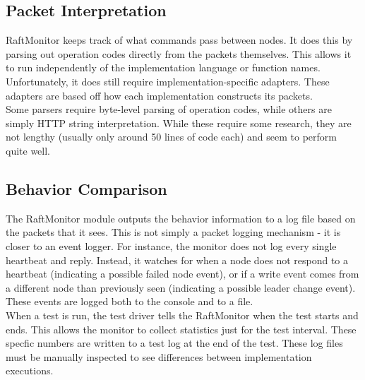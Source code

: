\documentclass[UTF8]{article}
\begin{document}
\subsection{Packet Interpretation}
RaftMonitor keeps track of what commands pass between nodes. It does this by parsing out operation codes directly from the packets themselves. This allows it to run independently of the implementation language or function names. Unfortunately, it does still require implementation-specific adapters. These adapters are based off how each implementation constructs its packets.
\\ \indent Some parsers require byte-level parsing of operation codes, while others are  simply HTTP string interpretation. While these require some research, they are not lengthy (usually only around 50 lines of code each) and seem to perform quite well.

\subsection{Behavior Comparison}
The RaftMonitor module outputs the behavior information to a log file based on the packets that it sees. This is not simply a packet logging mechanism - it is closer to an event logger. For instance, the monitor does not log every single heartbeat and reply. Instead, it watches for when a node does not respond to a heartbeat (indicating a possible failed node event), or if a write event comes from a different node than previously seen (indicating a possible leader change event). These events are logged both to the console and to a file.
\\ \indent When a test is run, the test driver tells the RaftMonitor when the test starts and ends. This allows the monitor to collect statistics just for the test interval. These specfic numbers are written to a test log at the end of the test. These log files must be manually inspected to see differences between implementation executions.
\end{document}

